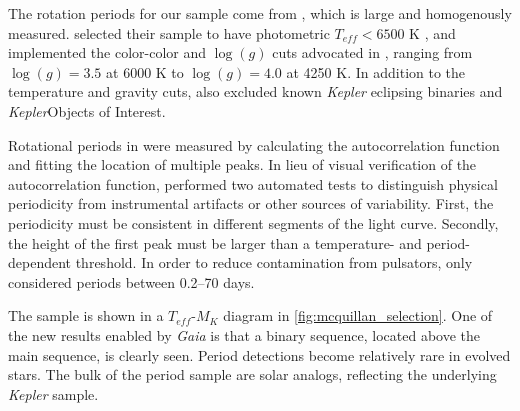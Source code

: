 \documentclass[manuscript]{aastex6}
\newcommand{\Kepler}{\mbox{\textit{Kepler}}}
\newcommand{\Gaia}{\mbox{\textit{Gaia}}}
\newcommand{\Teff}{\ensuremath{T_{eff}}}
\newcommand{\logg}{\ensuremath{\log(g)}}
\begin{document}
The rotation periods for our sample come from \citet{McQuillan14}, which
is large and homogenously measured. \citet{McQuillan14} selected their sample 
to have photometric \(\Teff < 6500\) K \citep{Brown11,Dressing13}, and 
implemented the color-color and \logg{} cuts advocated in \citet{Ciardi11}, 
ranging from \(\logg = 3.5\) at 6000 K to \(\logg = 4.0\) at 4250 K. 
In addition to the temperature and gravity cuts, \citet{McQuillan14} also 
excluded known \Kepler{} eclipsing binaries and \Kepler Objects of Interest. 

Rotational periods in \citet{McQuillan14} were measured by calculating the 
autocorrelation function and fitting the location of multiple peaks. In lieu 
of visual verification of the autocorrelation function, \citet{McQuillan14}
performed two automated tests to distinguish physical periodicity from
instrumental artifacts or other sources of variability. First, the 
periodicity must be consistent in different segments of the light curve.
Secondly, the height of the first peak must be larger than a temperature- and
period-dependent threshold. In order to reduce contamination from pulsators, 
\citet{McQuillan14} only considered periods between 0.2--70 days.

\begin{figure*}[htb]
    \centering
    \caption{\emph{Left:} \Teff-\(M_K\) density plot of the sample of
        \citet{McQuillan14} period detections. Color represents the number of
        objects in each bin. A binary sequence is clearly 
        visible above the lower main sequence. Temperatures are from
        \citet{Pinsonneault12}. The bin size is 100 K in
        temperature and 0.02 mag in K-band absolute magnitude. A 
        representative error bar is shown on the bottom right corner, although
        the vertical error bar is too small to be easily visible. 
        \emph{Right:} The variation in the \citet{McQuillan14} period 
        detection fraction across the \Teff-\(M_K\) 
    diagram.}\label{fig:mcquillan_selection}
\end{figure*}

The \citet{McQuillan14} sample is shown in a \Teff-\(M_K\)
diagram in \cref{fig:mcquillan_selection}. One of the new results enabled by 
\Gaia{} is that a binary sequence,
located above the main sequence, is clearly seen. Period detections become
relatively rare in evolved stars. The bulk of the period sample are solar
analogs, reflecting the underlying \Kepler{} sample.
\end{document}
